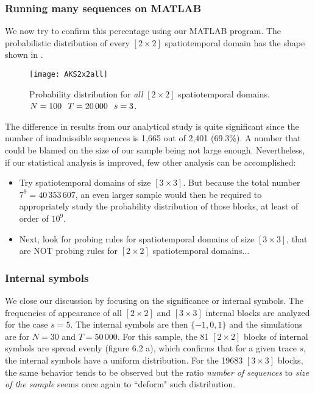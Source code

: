 \subsubsection{Running many sequences on MATLAB}

We now try to confirm this percentage using our MATLAB program. The
probabilistic distribution of every $[2\!\times\!2]$ spatiotemporal domain
has the  shape shown in .


\begin{figure}[h]
\centering
\texttt{[image: AKS2x2all]}
\captionsetup{justification = centering}
\caption{\label{fig:AKS2x2all}
Probability distribution for {\em all} $[2\!\times\!2]$ spatiotemporal domains.
\\
$N =100 \hskip 0.1in T = 20\,000 \hskip 0.1in s = 3$.
        }
\end{figure}

The difference in results from our analytical study is quite significant
since the number of inadmissible sequences is 1,665 out of 2,401 (69.3\%). A
number that could be blamed on the size of our sample being not large enough.
Nevertheless, if our statistical analysis is improved, few other analysis can
be accomplished:

\begin{itemize}
\item
Try spatiotemporal domains of size $[3\!\times\!3]$. But because the
total number $7^9 = 40\,353\,607$, an even larger sample would then be
required to appropriately study the probability distribution of those
blocks, at least of order of $10^9$.
\item
Next, look for probing rules for spatiotemporal domains of size $[3\!\times\!3]$,
that are NOT probing rules for $[2\!\times\!2]$ spatiotemporal domains...
\end{itemize}

\subsubsection{Internal symbols}
We close our discussion by focusing on the significance or internal
symbols. The frequencies of appearance of all $[2\!\times\!2]$ and $[3\!\times\!3]$
internal blocks are analyzed for the case $s=5$. The internal symbols
are then $\{-1, 0, 1\}$ and the simulations are  for $N = 30$ and $T =
50\,000$. For this sample, the 81 $[2\!\times\!2]$ blocks of internal symbols
are spread evenly (figure 6.2 a), which confirms that for a given trace
$s$, the internal symbols have a uniform distribution. For the 19683 $[3\!\times\!3]$
blocks, the same behavior tends to be observed but the ratio
\textit{number of sequences} to \textit{size of the sample} seems once
again to ``deform" such distribution.

